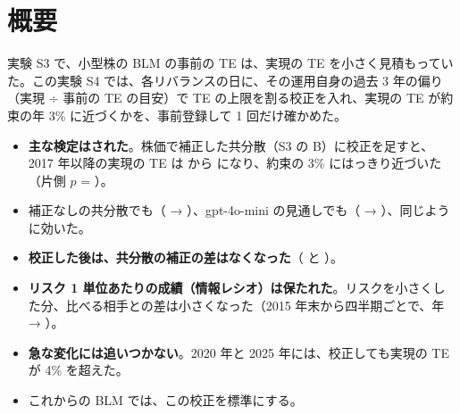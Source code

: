 \chapter*{概要}

実験 S3 で、小型株の BLM の事前の TE は、実現の TE を小さく見積もっていた。この実験 S4 では、各リバランスの日に、その運用自身の過去 3 年の偏り（実現 ÷ 事前の TE の目安）で TE の上限を割る校正を入れ、実現の TE が約束の年 3\% に近づくかを、事前登録して 1 回だけ確かめた。

\begin{keybox}[要点]
\begin{itemize}
\item \textbf{主な検定はされた}。株価で補正した共分散（S3 の B）に校正を足すと、2017 年以降の実現の TE は  から  になり、約束の 3\% にはっきり近づいた（片側 $p$ = ）。
\item 補正なしの共分散でも（ → ）、gpt-4o-mini の見通しでも（ → ）、同じように効いた。
\item \textbf{校正した後は、共分散の補正の差はなくなった}（ と ）。
\item \textbf{リスク 1 単位あたりの成績（情報レシオ）は保たれた}。リスクを小さくした分、比べる相手との差は小さくなった（2015 年末から四半期ごとで、年  → ）。
\item \textbf{急な変化には追いつかない}。2020 年と 2025 年には、校正しても実現の TE が 4\% を超えた。
\item これからの BLM では、この校正を標準にする。
\end{itemize}
\end{keybox}
